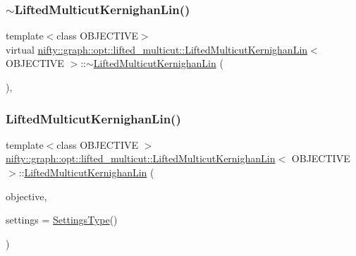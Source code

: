 \subsubsection{\texorpdfstring{$\sim$\+Lifted\+Multicut\+Kernighan\+Lin()}{~LiftedMulticutKernighanLin()}}
{\footnotesize\ttfamily template$<$class O\+B\+J\+E\+C\+T\+I\+VE$>$ \\
virtual \hyperlink{classnifty_1_1graph_1_1opt_1_1lifted__multicut_1_1LiftedMulticutKernighanLin}{nifty\+::graph\+::opt\+::lifted\+\_\+multicut\+::\+Lifted\+Multicut\+Kernighan\+Lin}$<$ O\+B\+J\+E\+C\+T\+I\+VE $>$\+::$\sim$\hyperlink{classnifty_1_1graph_1_1opt_1_1lifted__multicut_1_1LiftedMulticutKernighanLin}{Lifted\+Multicut\+Kernighan\+Lin} (\begin{DoxyParamCaption}{ }\end{DoxyParamCaption})\hspace{0.3cm}{\ttfamily [inline]}, {\ttfamily [virtual]}}

\mbox{\label{classnifty_1_1graph_1_1opt_1_1lifted__multicut_1_1LiftedMulticutKernighanLin_ac0e6db9d278ca6b1ffe613345ccf413b}} 
\subsubsection{\texorpdfstring{Lifted\+Multicut\+Kernighan\+Lin()}{LiftedMulticutKernighanLin()}}
{\footnotesize\ttfamily template$<$class O\+B\+J\+E\+C\+T\+I\+VE $>$ \\
\hyperlink{classnifty_1_1graph_1_1opt_1_1lifted__multicut_1_1LiftedMulticutKernighanLin}{nifty\+::graph\+::opt\+::lifted\+\_\+multicut\+::\+Lifted\+Multicut\+Kernighan\+Lin}$<$ O\+B\+J\+E\+C\+T\+I\+VE $>$\+::\hyperlink{classnifty_1_1graph_1_1opt_1_1lifted__multicut_1_1LiftedMulticutKernighanLin}{Lifted\+Multicut\+Kernighan\+Lin} (\begin{DoxyParamCaption}\item[{const \hyperlink{classnifty_1_1graph_1_1opt_1_1lifted__multicut_1_1LiftedMulticutKernighanLin_ace1226557a9d65b35b09e1e38b11b0b3}{Objective\+Type} \&}]{objective,  }\item[{const \hyperlink{structnifty_1_1graph_1_1opt_1_1lifted__multicut_1_1LiftedMulticutKernighanLin_1_1SettingsType}{Settings\+Type} \&}]{settings = {\ttfamily \hyperlink{structnifty_1_1graph_1_1opt_1_1lifted__multicut_1_1LiftedMulticutKernighanLin_1_1SettingsType}{Settings\+Type}()} }\end{DoxyParamCaption})}



